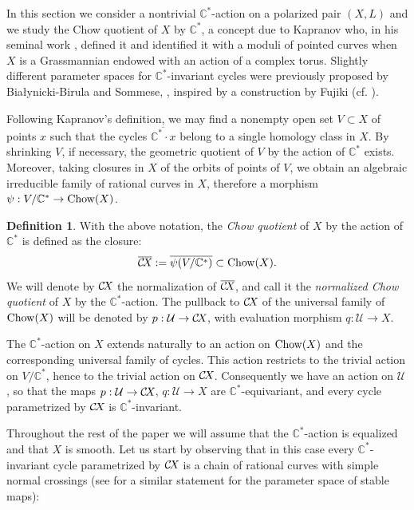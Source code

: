 \documentclass[10pt,a4paper]{article}
\numberwithin{equation}{section}
\theoremstyle{definition}
\newtheorem{definition}[theorem]{Definition}
\theoremstyle{remark}
\def\C{{\mathbb C}}
\def\cU{{\mathcal U}}
\def\operatorname#1{\mathop{\rm #1}\nolimits}
\def\Chow{\operatorname{Chow}}
\def\CX{\mathcal{C}\!X\hspace{-0.5pt}}
\begin{document}
In this section we consider a nontrivial $\C^*$-action on a polarized pair $(X,L)$ and we  study the Chow quotient of $X$ by $\C^*$, a concept due to Kapranov who, in his seminal work \cite{wors6-Kap}, defined it and identified it with a moduli of pointed curves when $X$ is a Grassmannian endowed with an action of a complex torus. Slightly different parameter spaces for $\C^*$-invariant cycles were previously proposed  by Bia{\l}ynicki-Birula and Sommese, \cite{wors6-BBSo}, inspired by a construction by Fujiki (cf. \cite{wors6-Fj}).

Following Kapranov's definition,  we may find a nonempty open set $V\subset X$ of points $x$ such that the cycles $\overline{\C^*\cdot x}$ belong to a single homology class in $X$. By shrinking $V$, if necessary, the geometric quotient of $V$ by the action of $\C^*$ exists. Moreover, taking closures in $X$ of the orbits of points of $V$, we obtain an algebraic irreducible family of rational curves in $X$, therefore a morphism $\psi:V/\C^*\to \Chow(X)$.

\begin{definition}
With the above notation, the {\em Chow quotient} of $X$ by the action of $\C^*$ is defined as the closure:
$$
\overline{\CX}:=\overline{\psi(V/\C^*)}\subset \Chow(X).
$$
We will denote by $\CX$ the normalization of $\overline{\CX}$, and call it the {\em normalized Chow quotient} of $X$ by the $\C^*$-action. 
The pullback to $\CX$ of the universal family of $\Chow(X)$ will be denoted by $p:\cU\to \CX$, with evaluation morphism $q:\cU\to X$.
\end{definition}

The  $\C^*$-action on $X$ extends naturally to an action on $\Chow(X)$ and the corresponding universal family of cycles. This action restricts to the trivial action on $V/\C^*$, hence to the trivial action on $\CX$. Consequently we have an action on $\cU$, so that the maps $p:\cU\to\CX$, $q:\cU\to X$ are $\C^*$-equivariant, and every cycle parametrized by $\CX$ is $\C^*$-invariant. 

\setcounter{theorem}{2}

Throughout the rest of the paper we will assume that  the  $\C^*$-action is  equalized and that $X$ is smooth. Let us start by observing that in this case every $\C^*$-invariant cycle parametrized by $\CX$ is a chain of rational curves with simple normal crossings
(see \cite[Lemma 3.12]{wors6-MMW} for a similar statement for the parameter space of stable maps):
\end{document}
